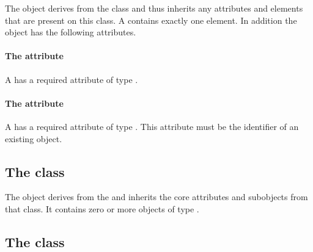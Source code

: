 


The \Domain object derives from the \SBase class and thus inherits any
attributes and elements that are present on this class.
A \Domain contains exactly one \ListOfInteriorPoints element.
In addition the \Domain object has the following attributes.

\paragraph{The \fixttspace{} attribute}

A \Domain has a required attribute  of type .


\paragraph{The \fixttspace{} attribute}

A \Domain has a required attribute  of type
.
This attribute must be the identifier of an existing \DomainType object.


\subsection{The  class}
\label{listofinteriorpoints-class}


The \ListOfInteriorPoints object derives from the  and
inherits the core attributes and subobjects from that class. It contains
zero or more objects of type \InteriorPoint.

\subsection{The  class}
\label{interiorpoint-class}

